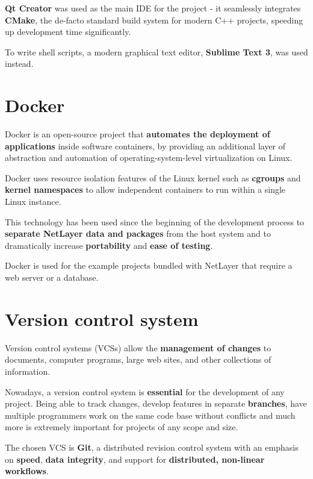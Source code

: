 \documentclass[11pt]{report}
\newcommand{\+}{\discretionary{\mbox{\scriptsize$\hookleftarrow$}}{}{}}
\renewcommand\emph{\textbf}
\begin{document}
                \emph{Qt Creator} was used as the main IDE for the project - it seamlessly integrates \emph{CMake}, the de-facto standard build system for modern C++ projects, speeding up development time significantly.

                To write shell scripts, a modern graphical text editor, \emph{Sublime Text 3}, was used instead.

            \section{Docker}
                Docker is an open-source project that \emph{automates the deployment of applications} inside software containers, by providing an additional layer of abstraction and automation of operating-system-level virtualization on Linux.

                Docker uses resource isolation features of the Linux kernel such as \emph{cgroups} and \emph{kernel namespaces} to allow independent containers to run within a single Linux instance.

                This technology has been used since the beginning of the development process to \emph{separate NetLayer data and packages} from the host system and to dramatically increase \emph{portability} and \emph{ease of testing}.

                Docker is used for the example projects bundled with NetLayer that require a web server or a database.

            \section{Version control system}
                Version control systems (VCSs) allow the \emph{management of changes} to documents, computer programs, large web sites, and other collections of information.

                Nowadays, a version control system is \emph{essential} for the development of any project.
                Being able to track changes, develop features in separate \emph{branches}, have multiple programmers work on the same code base without conflicts and much more is extremely important for projects of any scope and size.

                The chosen VCS is \emph{Git}, a distributed revision control system with an emphasis on \emph{speed}, \emph{data integrity}, and support for \emph{distributed, non-linear workflows}.
\end{document}
